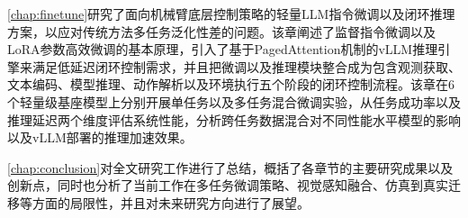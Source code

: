 \cref{chap:finetune}研究了面向机械臂底层控制策略的轻量LLM指令微调以及闭环推理方案，以应对传统方法多任务泛化性差的问题。该章阐述了监督指令微调以及LoRA参数高效微调的基本原理，引入了基于PagedAttention机制的vLLM推理引擎来满足低延迟闭环控制需求，并且把微调以及推理模块整合成为包含观测获取、文本编码、模型推理、动作解析以及环境执行五个阶段的闭环控制流程。该章在6个轻量级基座模型上分别开展单任务以及多任务混合微调实验，从任务成功率以及推理延迟两个维度评估系统性能，分析跨任务数据混合对不同性能水平模型的影响以及vLLM部署的推理加速效果。

\cref{chap:conclusion}对全文研究工作进行了总结，概括了各章节的主要研究成果以及创新点，同时也分析了当前工作在多任务微调策略、视觉感知融合、仿真到真实迁移等方面的局限性，并且对未来研究方向进行了展望。